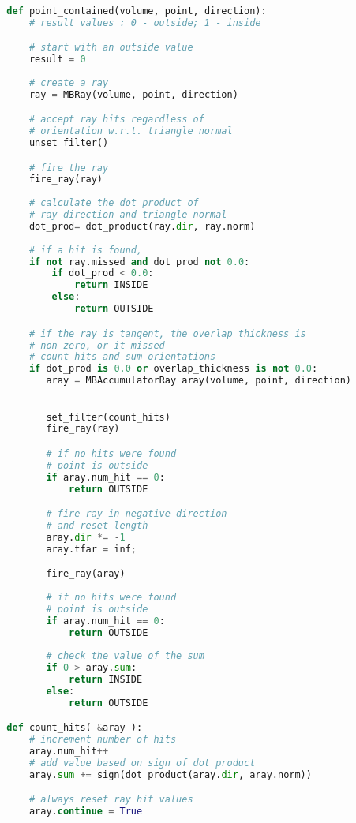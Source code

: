 \begin{lstlisting}[language=Python,basicstyle=\tiny,caption={Algorithm for point containment within a volume.},
    label={alg:Point Containment Pseudo Code},captionpos=b]
  
  def point_contained(volume, point, direction):
      # result values : 0 - outside; 1 - inside

      # start with an outside value
      result = 0
  
      # create a ray
      ray = MBRay(volume, point, direction)

      # accept ray hits regardless of
      # orientation w.r.t. triangle normal
      unset_filter()

      # fire the ray
      fire_ray(ray)
      
      # calculate the dot product of
      # ray direction and triangle normal
      dot_prod= dot_product(ray.dir, ray.norm)
      
      # if a hit is found, 
      if not ray.missed and dot_prod not 0.0:
          if dot_prod < 0.0:
              return INSIDE
          else:
              return OUTSIDE

      # if the ray is tangent, the overlap thickness is
      # non-zero, or it missed - 
      # count hits and sum orientations
      if dot_prod is 0.0 or overlap_thickness is not 0.0:
         aray = MBAccumulatorRay aray(volume, point, direction)

         
         set_filter(count_hits)
         fire_ray(ray)

         # if no hits were found
         # point is outside
         if aray.num_hit == 0:
             return OUTSIDE

         # fire ray in negative direction
         # and reset length
         aray.dir *= -1
         aray.tfar = inf;

         fire_ray(aray)
         
         # if no hits were found
         # point is outside
         if aray.num_hit == 0:
             return OUTSIDE
            
         # check the value of the sum
         if 0 > aray.sum:
             return INSIDE
         else:
             return OUTSIDE

  def count_hits( &aray ):
      # increment number of hits
      aray.num_hit++
      # add value based on sign of dot product
      aray.sum += sign(dot_product(aray.dir, aray.norm))

      # always reset ray hit values
      aray.continue = True

\end{lstlisting}

